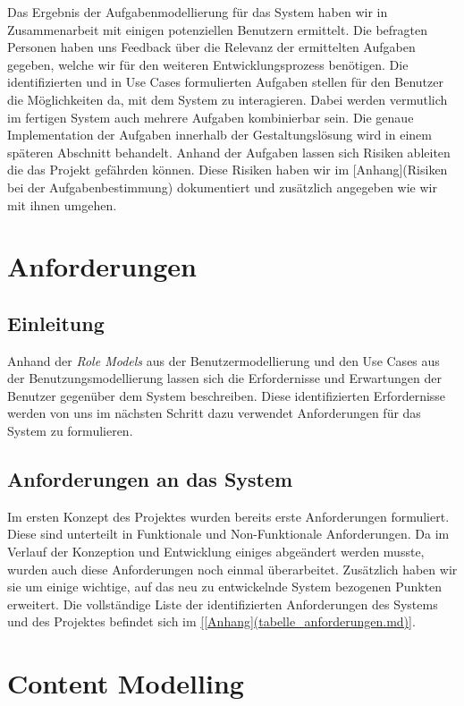Das Ergebnis der Aufgabenmodellierung für das System haben wir in
Zusammenarbeit mit einigen potenziellen Benutzern ermittelt.
Die befragten Personen haben uns Feedback über die Relevanz der ermittelten
Aufgaben gegeben, welche wir für den weiteren Entwicklungsprozess benötigen.
Die identifizierten und in Use Cases formulierten Aufgaben stellen für den
Benutzer die Möglichkeiten da, mit dem System zu interagieren. Dabei werden
vermutlich im fertigen System auch mehrere Aufgaben kombinierbar sein.
Die genaue Implementation der Aufgaben innerhalb der Gestaltungslösung wird in
einem späteren Abschnitt behandelt. Anhand der Aufgaben lassen sich Risiken
ableiten die das Projekt gefährden können. Diese Risiken haben wir im [Anhang](Risiken bei der Aufgabenbestimmung)
dokumentiert und zusätzlich angegeben wie wir mit ihnen umgehen.


\section{Anforderungen}
\label{sec:Anforderungen}

\subsection{Einleitung}
\label{sec:Anforderungen Einleitung}
Anhand der \textit{Role Models} aus der Benutzermodellierung und den Use Cases
aus der Benutzungsmodellierung lassen sich die Erfordernisse und Erwartungen
der Benutzer gegenüber dem System beschreiben. Diese identifizierten
Erfordernisse werden von uns im nächsten Schritt dazu verwendet Anforderungen
für das System zu formulieren.

\subsection{Anforderungen an das System}
\label{sec:Anforderungen an das System}
Im ersten Konzept des Projektes wurden bereits erste Anforderungen formuliert.
Diese sind unterteilt in Funktionale und Non-Funktionale Anforderungen.
Da im Verlauf der Konzeption und Entwicklung einiges abgeändert werden musste,
wurden auch diese Anforderungen noch einmal überarbeitet. Zusätzlich haben wir
sie um einige wichtige, auf das neu zu entwickelnde System bezogenen Punkten
erweitert. Die vollständige Liste der identifizierten Anforderungen des Systems
und des Projektes befindet sich im \ref{[Anhang](tabelle_anforderungen.md)}.


\section{Content Modelling}
\label{sec:Content Modelling}


